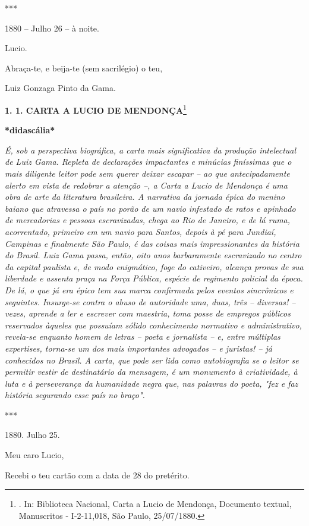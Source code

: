 ***

1880 -- Julho 26 -- à noite.

Lucio.

Abraça-te, e beija-te (sem sacrilégio) o teu,

Luiz Gonzaga Pinto da Gama.

\textbf{1. 1. CARTA A LUCIO DE MENDONÇA}\footnote{. In: Biblioteca
  Nacional, Carta a Lucio de Mendonça, Documento textual, Manuscritos -
  I-2-11,018, São Paulo, 25/07/1880.}

\textbf{*didascália*}

\emph{É, sob a perspectiva biográfica, a carta mais significativa da
produção intelectual de Luiz Gama. Repleta de declarações impactantes e
minúcias finíssimas que o mais diligente leitor pode sem querer deixar
escapar -- ao que antecipadamente alerto em vista de redobrar a atenção
--, a Carta a Lucio de Mendonça é uma obra de arte da literatura
brasileira. A narrativa da jornada épica do menino baiano que atravessa
o país no porão de um navio infestado de ratos e apinhado de mercadorias
e pessoas escravizadas, chega ao Rio de Janeiro, e de lá ruma,
acorrentado, primeiro em um navio para Santos, depois à pé para Jundiaí,
Campinas e finalmente São Paulo, é das coisas mais impressionantes da
história do Brasil. Luiz Gama passa, então, oito anos barbaramente
escravizado no centro da capital paulista e, de modo enigmático, foge do
cativeiro, alcança provas de sua liberdade e assenta praça na Força
Pública, espécie de regimento policial da época. De lá, o que já era
épico tem sua marca confirmada pelos eventos sincrônicos e seguintes.
Insurge-se contra o abuso de autoridade uma, duas, três -- diversas! --
vezes, aprende a ler e escrever com maestria, toma posse de empregos
públicos reservados àqueles que possuíam sólido conhecimento normativo e
administrativo, revela-se enquanto homem de letras -- poeta e jornalista
-- e, entre múltiplas expertises, torna-se um dos mais importantes
advogados -- e juristas! -- já conhecidos no Brasil. A carta, que pode
ser lida como autobiografia se o leitor se permitir vestir de
destinatário da mensagem, é um monumento à criatividade, à luta e à
perseverança da humanidade negra que, nas palavras do poeta, "fez e faz
história segurando esse país no braço". }

***

1880. Julho 25.

Meu caro Lucio,

Recebi o teu cartão com a data de 28 do pretérito.

